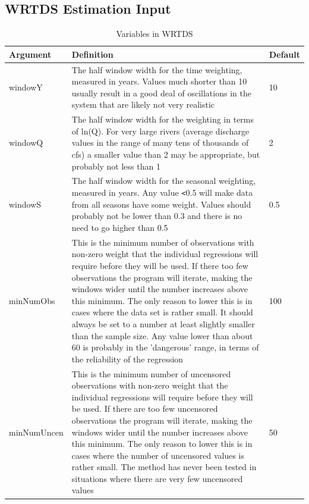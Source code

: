 \documentclass[a4paper,11pt]{article}\usepackage[]{graphicx}\usepackage[]{color}
\begin{document}
\subsection{WRTDS Estimation Input}
\label{sec:wrtdsInputVariables}
\begin{table}[ht]
\caption{Variables in WRTDS  \label{tab:WRTDS}}
\begin{tabularx}{\textwidth}{lXl}
\hline
  \textbf{Argument} & \textbf{Definition} & \textbf{Default} \\
\hline
windowY & The half window width for the time weighting, measured in years.  Values much shorter than 10 usually result in a good deal of oscillations in the system that are likely not very realistic & 10\\
windowQ & The half window width for the weighting in terms of ln(Q).  For very large rivers (average discharge values in the range of many tens of thousands of cfs) a smaller value than 2 may be appropriate, but probably not less than 1 & 2 \\
windowS & The half window width for the seasonal weighting, measured in years.  Any value \texttt{<}0.5 will make data from all seasons have some weight.  Values should probably not be lower than 0.3 and there is no need to go higher than 0.5 & 0.5 \\
minNumObs & This is the minimum number of observations with non-zero weight that the individual regressions will require before they will be used.  If there too few observations the program will iterate, making the windows wider until the number increases above this minimum.  The only reason to lower this is in cases where the data set is rather small.  It should always be set to a number at least slightly smaller than the sample size.  Any value lower than about 60 is probably in the 'dangerous' range, in terms of the reliability of the regression & 100 \\ 
minNumUncen & This is the minimum number of uncensored observations with non-zero weight that the individual regressions will require before they will be used.  If there are too few uncensored observations the program will iterate, making the windows wider until the number increases above this minimum.  The only reason to lower this is in cases where the number of uncensored values is rather small.  The method has never been tested in situations where there are very few uncensored values & 50 \\
\hline
\end{tabularx}

\end{table}
\end{document}
